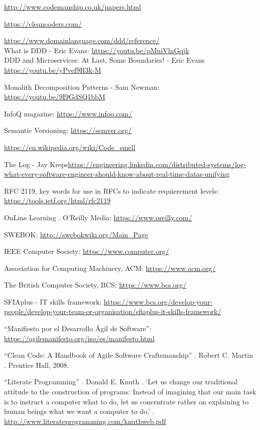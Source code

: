 \documentclass[spanish,12pt,a4paper,final,oneside]{book}
\begin{document}
\url{http://www.codemanship.co.uk/papers.html}

\url{https://cleancoders.com/}

\url{https://www.domainlanguage.com/ddd/reference/}
\\What is DDD - Eric Evans: \url{https://youtu.be/pMuiVlnGqjk}
\\DDD and Microservices: At Last, Some Boundaries! - Eric Evans
\\ \url{https://youtu.be/yPvef9R3k-M}

Monolith Decomposition Patterns - Sam Newman: \url{https://youtu.be/9I9GdSQ1bbM}

InfoQ magazine: \url{https://www.infoq.com/}

Semantic Versioning: \url{https://semver.org/}

\url{https://en.wikipedia.org/wiki/Code_smell}

The Log - Jay Kreps\url{https://engineering.linkedin.com/distributed-systems/log-what-every-software-engineer-should-know-about-real-time-datas-unifying}

RFC 2119, key words for use in RFCs to indicate requierement levels: 
\\ \url{https://tools.ietf.org/html/rfc2119}

OnLine Learning . O’Reilly Media: \url{https://www.oreilly.com/}

SWEBOK:  \url{http://swebokwiki.org/Main_Page}

IEEE Computer Society:  \url{https://www.computer.org/}

Association for Computing Machinery, ACM:  \url{https://www.acm.org/}

The British Computer Society, BCS: \url{https://www.bcs.org/}

SFIAplus - IT skills framework: \url{https://www.bcs.org/develop-your-people/develop-your-team-or-organisation/sfiaplus-it-skills-framework/}

``Manifiesto por el Desarrollo Ágil de Software'': \url{https://agilemanifesto.org/iso/es/manifesto.html}

``Clean Code: A Handbook of Agile Software Craftsmanship'' . Robert C. Martin . Prentice Hall, 2008.

``Literate Programming'' . Donald E. Knuth . ‘Let us change our traditional attitude to the construction of programs: Instead of imagining that our main task is to instruct a computer what to do, let us concentrate rather on explaining to human beings what we want a computer to do.’ . \url{http://www.literateprogramming.com/knuthweb.pdf}
\end{document}
